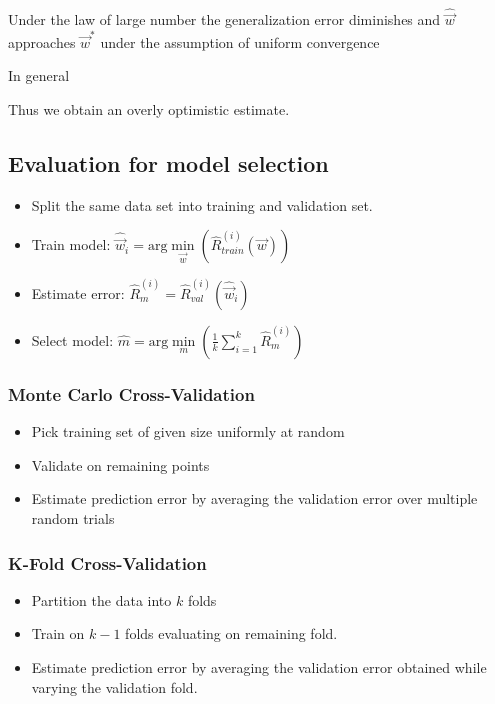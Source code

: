 \documentclass[8pt,a4paper]{scrartcl}
\newcommand{\Argmin}[2]{\text{arg}\underset{#1}{\min}\left(#2\right)}
\begin{document}
\begin{multicols*}{3}
Under the law of large number the generalization error diminishes and $\hat{\vec{w}}$ approaches $\vec{w}^\ast$ under the assumption of uniform convergence


In general


Thus we obtain an overly optimistic estimate.

\subsection{Evaluation for model selection}

\begin{itemize}
\ncompaq
\item Split the same data set into training and validation set.

\item Train model: $\hat{\vec{w}}_i=\Argmin{\vec{w}}{\hat{R}_{train}^{(i)}(\vec{w})}$
\item Estimate error: $\hat{R}_m^{(i)}=\hat{R}_{val}^{(i)}(\hat{\vec{w}}_i)$
\item Select model: $\hat{m}=\Argmin{m}{\frac{1}{k}\sum\limits_{i=1}^k\hat{R}_m^{(i)}}$
\end{itemize}

\subsubsection{Monte Carlo Cross-Validation}

\begin{itemize}
\ncompaq
\item Pick training set of given size uniformly at random
\item Validate on remaining points
\item Estimate prediction error by averaging the validation error over multiple random trials
\end{itemize}

\subsubsection{K-Fold Cross-Validation}

\begin{itemize}
\ncompaq
\item Partition the data into $k$ folds
\item Train on $k-1$ folds evaluating on remaining fold.
\item Estimate prediction error by averaging the validation error obtained while varying the validation fold.
\end{itemize}


\end{multicols*}
\end{document}
